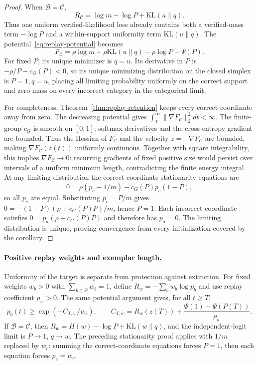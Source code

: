 \begin{proof}
When $\mathcal B=\mathcal C$,
\begin{equation}
  R_{\mathcal C}
  =\log m-\log P+\mathrm{KL}(u\|q).
  \label{eq:replay-mass-uniformity-decomposition}
\end{equation}
Thus one uniform verified-likelihood loss already contains both a verified-mass
term $-\log P$ and a within-support uniformity term $\mathrm{KL}(u\|q)$. The
potential~\eqref{eq:replay-potential} becomes
\[
  F_{\mathcal C}
  =\rho\log m+\rho\mathrm{KL}(u\|q)
   -\rho\log P-\Psi(P).
\]
For fixed $P$, its unique minimizer is $q=u$. Its derivative in $P$ is
$-\rho/P-c_G(P)<0$, so its unique minimizing distribution on the closed
simplex is $P=1,q=u$,
placing all limiting probability uniformly on the correct support and zero
mass on every incorrect category in the categorical limit.

For completeness, Theorem~\ref{thm:replay-retention} keeps every correct
coordinate away from zero. The decreasing potential gives
$\int_T^\infty\lVert\nabla F_{\mathcal C}\rVert_2^2dt<\infty$.
The finite-group $c_G$ is smooth on $[0,1]$; softmax derivatives and the
cross-entropy gradient are bounded. Thus the Hessian of $F_{\mathcal C}$ and
the velocity $\dot z=-\nabla F_{\mathcal C}$ are bounded, making
$\nabla F_{\mathcal C}(z(t))$ uniformly continuous. Together with square
integrability, this implies $\nabla F_{\mathcal C}\to0$: recurring gradients
of fixed positive size would persist over intervals of a uniform minimum
length, contradicting the finite energy integral. At any limiting
distribution the correct-coordinate stationarity equations are
\[
  0=\rho(p_c-1/m)-c_G(P)p_c(1-P),
\]
so all $p_c$ are equal. Substituting $p_c=P/m$ gives
$0=-(1-P)(\rho+c_G(P)P)/m$, hence $P=1$. Each incorrect coordinate satisfies
$0=p_a(\rho+c_G(P)P)$ and therefore has $p_a=0$. The limiting distribution is
unique, proving convergence from every initialization covered by the corollary.
\end{proof}

\paragraph{Positive replay weights and exemplar length.}
Uniformity of the target is separate from protection against extinction.
For fixed weights $w_b>0$ with $\sum_{b\in\mathcal B}w_b=1$, define
$R_w=-\sum_b w_b\log p_b$ and use replay coefficient $\rho_w>0$.
The same potential argument gives, for all $t\ge T$,
\[
 p_b(t)\ge\exp(-C_{T,w}/w_b),\qquad
 C_{T,w}=R_w(z(T))+\frac{\Psi(1)-\Psi(P(T))}{\rho_w}.
\]
If $\mathcal B=\mathcal C$, then
$R_w=H(w)-\log P+\mathrm{KL}(w\|q)$, and the independent-logit limit is
$P\to1$, $q\to w$. The preceding stationarity proof applies with $1/m$
replaced by $w_c$: summing the correct-coordinate equations forces $P=1$,
then each equation forces $p_c=w_c$.


